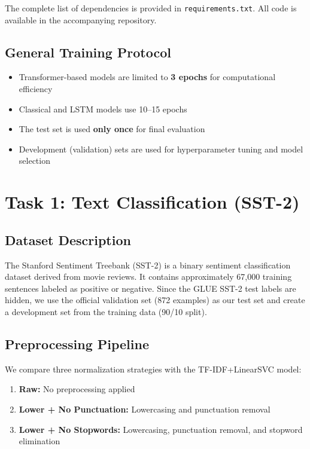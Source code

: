 \documentclass[12pt, a4paper]{article}
\begin{document}
The complete list of dependencies is provided in \texttt{requirements.txt}. All code is available in the accompanying repository.

\subsection{General Training Protocol}

\begin{itemize}
    \item Transformer-based models are limited to \textbf{3 epochs} for computational efficiency
    \item Classical and LSTM models use 10--15 epochs
    \item The test set is used \textbf{only once} for final evaluation
    \item Development (validation) sets are used for hyperparameter tuning and model selection
\end{itemize}

\section{Task 1: Text Classification (SST-2)}

\subsection{Dataset Description}

The Stanford Sentiment Treebank (SST-2) is a binary sentiment classification dataset derived from movie reviews. It contains approximately 67,000 training sentences labeled as positive or negative. Since the GLUE SST-2 test labels are hidden, we use the official validation set (872 examples) as our test set and create a development set from the training data (90/10 split).

\subsection{Preprocessing Pipeline}

We compare three normalization strategies with the TF-IDF+LinearSVC model:

\begin{enumerate}[label=\alph*)]
    \item \textbf{Raw:} No preprocessing applied
    \item \textbf{Lower + No Punctuation:} Lowercasing and punctuation removal
    \item \textbf{Lower + No Stopwords:} Lowercasing, punctuation removal, and stopword elimination
\end{enumerate}
\end{document}
